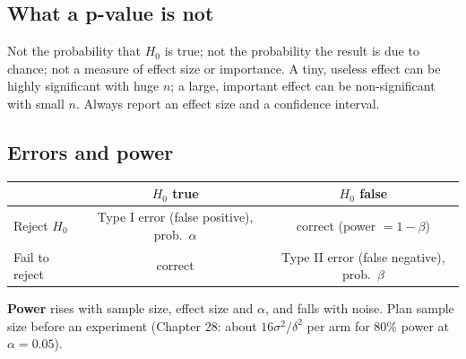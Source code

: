 \subsection{What a p-value is not}
Not the probability that $H_0$ is true; not the probability the result is due to chance; not a measure of effect size or importance. A tiny, useless effect can be highly
significant with huge $n$; a large, important effect can be non-significant with small $n$. Always report an effect size and a confidence interval.

\subsection{Errors and power}
\begin{center}\small
\begin{tabular}{l|cc}
& $H_0$ true & $H_0$ false\\\hline
Reject $H_0$ & Type I error (false positive), prob.\ $\alpha$ & correct (power $= 1 - \beta$)\\
Fail to reject & correct & Type II error (false negative), prob.\ $\beta$\\
\end{tabular}
\end{center}
\textbf{Power} rises with sample size, effect size and $\alpha$, and falls with noise. Plan sample size before an experiment (Chapter 28: about $16\sigma^2/\delta^2$ per arm for
80\% power at $\alpha = 0.05$).

